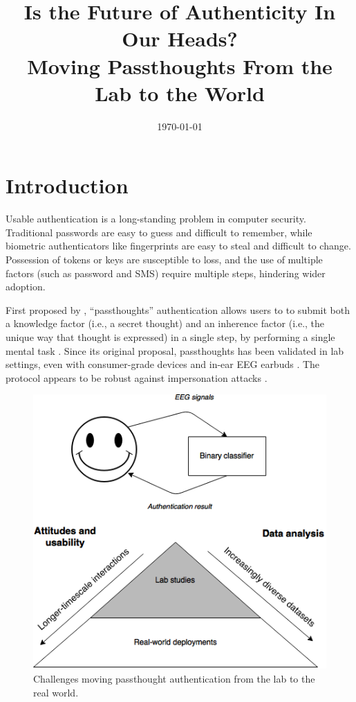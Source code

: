 \documentclass[sigconf]{acmart}
\date{\today}
\title{Is the Future of Authenticity In Our Heads?\\\medskip
\large Moving Passthoughts From the Lab to the World}
\begin{document}
\maketitle

\section{Introduction}
\label{sec:orge209717}

Usable authentication is a long-standing problem in computer security.
Traditional passwords are easy to guess and difficult to remember,
while biometric authenticators like fingerprints are easy to steal and difficult to change.
Possession of tokens or keys are susceptible to loss, 
and the use of multiple factors (such as password and SMS) require multiple steps, hindering wider adoption.

First proposed by \cite{Thorpe2005}, ``passthoughts'' authentication allows users to 
to submit both a knowledge factor (i.e., a secret thought) and an inherence factor (i.e., the unique way that thought is expressed)
in a single step, by performing a single mental task \cite{Johnson2014}.
Since its original proposal, passthoughts has been validated in lab settings, even with 
consumer-grade devices \cite{Chuang2013b} and in-ear EEG earbuds \cite{curranpassthoughts}.
The protocol appears to be robust against impersonation attacks \cite{Johnson2014}.


\label{fig:diagram}
\begin{figure}[htbp]
\centering
\includegraphics[width=.9\linewidth]{./figures/passthoughts-diagram.png}
\caption{Challenges moving passthought authentication from the lab to the real world.}
\end{figure}
\end{document}
